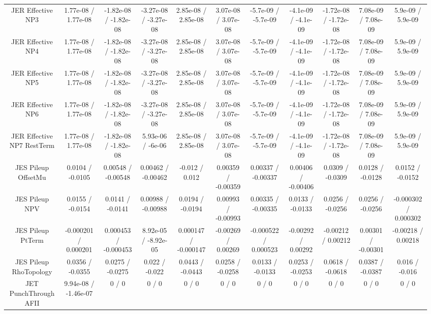 \begin{table}[htbp]
\begin{center}
\begin{tabular}{|c|c|c|c|c|c|c|c|c|c|c|}
  JER Effective NP3 & 1.77e-08 / 1.77e-08 & -1.82e-08 / -1.82e-08 & -3.27e-08 / -3.27e-08 & 2.85e-08 / 2.85e-08 & 3.07e-08 / 3.07e-08 & -5.7e-09 / -5.7e-09 & -4.1e-09 / -4.1e-09 & -1.72e-08 / -1.72e-08 & 7.08e-09 / 7.08e-09 & 5.9e-09 / 5.9e-09 \\ 
  JER Effective NP4 & 1.77e-08 / 1.77e-08 & -1.82e-08 / -1.82e-08 & -3.27e-08 / -3.27e-08 & 2.85e-08 / 2.85e-08 & 3.07e-08 / 3.07e-08 & -5.7e-09 / -5.7e-09 & -4.1e-09 / -4.1e-09 & -1.72e-08 / -1.72e-08 & 7.08e-09 / 7.08e-09 & 5.9e-09 / 5.9e-09 \\ 
  JER Effective NP5 & 1.77e-08 / 1.77e-08 & -1.82e-08 / -1.82e-08 & -3.27e-08 / -3.27e-08 & 2.85e-08 / 2.85e-08 & 3.07e-08 / 3.07e-08 & -5.7e-09 / -5.7e-09 & -4.1e-09 / -4.1e-09 & -1.72e-08 / -1.72e-08 & 7.08e-09 / 7.08e-09 & 5.9e-09 / 5.9e-09 \\ 
  JER Effective NP6 & 1.77e-08 / 1.77e-08 & -1.82e-08 / -1.82e-08 & -3.27e-08 / -3.27e-08 & 2.85e-08 / 2.85e-08 & 3.07e-08 / 3.07e-08 & -5.7e-09 / -5.7e-09 & -4.1e-09 / -4.1e-09 & -1.72e-08 / -1.72e-08 & 7.08e-09 / 7.08e-09 & 5.9e-09 / 5.9e-09 \\ 
  JER Effective NP7 RestTerm & 1.77e-08 / 1.77e-08 & -1.82e-08 / -1.82e-08 & 5.93e-06 / -6e-06 & 2.85e-08 / 2.85e-08 & 3.07e-08 / 3.07e-08 & -5.7e-09 / -5.7e-09 & -4.1e-09 / -4.1e-09 & -1.72e-08 / -1.72e-08 & 7.08e-09 / 7.08e-09 & 5.9e-09 / 5.9e-09 \\ 
  JES Pileup OffsetMu & 0.0104 / -0.0105 & 0.00548 / -0.00548 & 0.00462 / -0.00462 & -0.012 / 0.012 & 0.00359 / -0.00359 & 0.00337 / -0.00337 & 0.00406 / -0.00406 & 0.0309 / -0.0309 & 0.0128 / -0.0128 & 0.0152 / -0.0152 \\ 
  JES Pileup NPV & 0.0155 / -0.0154 & 0.0141 / -0.0141 & 0.00988 / -0.00988 & 0.0194 / -0.0194 & 0.00993 / -0.00993 & 0.00335 / -0.00335 & 0.0133 / -0.0133 & 0.0256 / -0.0256 & 0.0256 / -0.0256 & -0.000302 / 0.000302 \\ 
  JES Pileup PtTerm & -0.000201 / 0.000201 & 0.000453 / -0.000453 & 8.92e-05 / -8.92e-05 & 0.000147 / -0.000147 & -0.00269 / 0.00269 & -0.000522 / 0.000523 & -0.00292 / 0.00292 & -0.00212 / 0.00212 & 0.00301 / -0.00301 & -0.00218 / 0.00218 \\ 
  JES Pileup RhoTopology & 0.0356 / -0.0355 & 0.0275 / -0.0275 & 0.022 / -0.022 & 0.0443 / -0.0443 & 0.0258 / -0.0258 & 0.0133 / -0.0133 & 0.0253 / -0.0253 & 0.0618 / -0.0618 & 0.0387 / -0.0387 & 0.016 / -0.016 \\ 
  JET PunchThrough AFII & 9.94e-08 / -1.46e-07 & 0 / 0 & 0 / 0 & 0 / 0 & 0 / 0 & 0 / 0 & 0 / 0 & 0 / 0 & 0 / 0 & 0 / 0 \\ 

\end{tabular}
\end{center}
\end{table}
